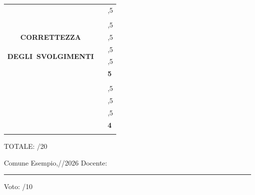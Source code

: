 \begin{tabularx}{\textwidth}{|c|>{\arraybackslash}m{11.8cm}|>{\left\arraybackslash}m{0.8cm}|}
\multirow{7}{*}{\parbox{3.3cm}{ \textbf{\scriptsize{\vspace{0cm}\\CORRETTEZZA\\\\ \mbox{DEGLI SVOLGIMENTI}}}\vspace{0.5cm}\\ \fontsize{9}{2}}}
& \fontsize{9}{2}\selectfont{Svolgimento \textbf{arbitrario ed incoerente} oppure non valutabile.} & 0,5 \\
\cline{2-3}
& \fontsize{9}{2}\selectfont{Svolgimento con una \textbf{procedura  gravemente  errata o esigua}.} & 1 \\
\cline{2-3}
& \fontsize{9}{2}\selectfont{Svolgimento con \textbf{rilevanti errori di calcolo o procedura}.} & 1,5 \\
\cline{2-3}
& \fontsize{9}{2}\selectfont{Svolgimento con \textbf{rilevanti errori di calcolo} in una \textbf{procedura quasi corretta}.} & 2,5 \\
\cline{2-3}
& \fontsize{8.5}{2}\selectfont{Svolgimento con un numero non rilevante di \textbf{errori non gravi nei calcoli e nel procedimento}.} & 3,5 \\
\cline{2-3}
& \fontsize{8.5}{2}\selectfont{Svolgimento con numero esiguo di \textbf{errori non gravi di calcolo} in un \textbf{procedimento corretto}.} & 4,5 \\
\cline{2-3}
& \fontsize{9}{2}\selectfont{Svolgimento \textbf{privo di errori} nei calcoli e nel procedimento.} & \textbf{5} \\
\Xhline{2pt}

\multirow{5}{*}{\parbox{3.3cm}{ \textbf{\\COMPLETEZZA}}}
& \fontsize{9}{2}\selectfont{Non svolto o svolto in misura esigua.} & 1 \\
\cline{2-3}
& \fontsize{9}{2}\selectfont{Svolgimento sommario.} & 1,5 \\
\cline{2-3}
& \fontsize{9}{2}\selectfont{Svolgimento di una parte rilevante.} & 2,5 \\
\cline{2-3}
& \fontsize{9}{2}\selectfont{Svolto quasi completamente.} & 3,5 \\
\cline{2-3}
& \fontsize{9}{2}\selectfont{Svolto completamente.} & \textbf{4} \\
\Xhline{2pt}
\end{tabularx}

\vspace{0.2cm}
\hspace{14.2cm} TOTALE: \hspace{1cm}/20
\vspace{0.5cm}

Comune Esempio,\raisebox{-1mm}{\rule{1cm}{0.4pt}}/\raisebox{-1mm}{\rule{1cm}{0.4pt}}/2026
\hspace{0.5cm} Docente:\rule{5cm}{0.4pt}
\hspace{2cm} Voto: \hspace{1.8cm}/10